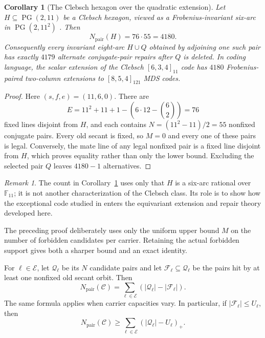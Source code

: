 \documentclass[11pt]{article}
\newtheorem{corollary}[theorem]{Corollary}
\theoremstyle{definition}
\theoremstyle{remark}
\newtheorem{remark}[theorem]{Remark}
\newcommand{\PG}{\operatorname{PG}}
\newcommand{\F}{\mathbb{F}}
\newcommand{\cC}{\mathcal{C}}
\newcommand{\cE}{\mathcal{E}}
\newcommand{\cQ}{\mathcal{Q}}
\newcommand{\cF}{\mathcal{F}}
\newcommand{\Npair}{N_{\mathrm{pair}}}
\newcommand{\pospart}[1]{\left(#1\right)_{+}}
\begin{document}
\begin{corollary}[The Clebsch hexagon over the quadratic extension]
\label{cor:clebsch-pair-extension}
Let $H\subseteq\PG(2,11)$ be a Clebsch hexagon, viewed as a
Frobenius-invariant six-arc in $\PG(2,11^2)$
\cite{RuddClebschRigidity2026}.  Then
\[
  \Npair(H)=76\cdot55=4180.
\]
Consequently every invariant eight-arc $H\cup Q$ obtained by adjoining one
such pair has exactly $4179$ alternate conjugate-pair repairs after $Q$ is
deleted.  In coding language, the scalar extension of the Clebsch
$[6,3,4]_{11}$ code has $4180$ Frobenius-paired two-column extensions to
$[8,5,4]_{121}$ MDS codes.
\end{corollary}

\begin{proof}
Here $(s,f,e)=(11,6,0)$.  There are
\[
 E=11^2+11+1-\left(6\cdot12-\binom62\right)=76
\]
fixed lines disjoint from $H$, and each contains
$N=(11^2-11)/2=55$ nonfixed conjugate pairs.  Every old secant is fixed, so
$M=0$ and every one of these pairs is legal.  Conversely, the mate line of
any legal nonfixed pair is a fixed line disjoint from $H$, which proves
equality rather than only the lower bound.  Excluding the selected pair
$Q$ leaves $4180-1$ alternatives.
\end{proof}

\begin{remark}
The count in Corollary~\ref{cor:clebsch-pair-extension} uses only that $H$
is a six-arc rational over $\F_{11}$; it is not another characterization of
the Clebsch class.  Its role is to show how the exceptional code studied in
\cite{RuddClebschRigidity2026} enters the equivariant extension and repair
theory developed here.
\end{remark}

The preceding proof deliberately uses only the uniform upper bound $M$ on
the number of forbidden candidates per carrier.  Retaining the actual
forbidden support gives both a sharper bound and an exact identity.

For $\ell\in\cE$, let $\cQ_\ell$ be its $N$ candidate pairs and let
$\cF_\ell\subseteq\cQ_\ell$ be the pairs hit by at least one nonfixed old
secant orbit.  Then
\begin{equation}\label{eq:heterogeneous}
  \Npair(\cC)=\sum_{\ell\in\cE}
  \left(|\cQ_\ell|-|\cF_\ell|\right).
\end{equation}
The same formula applies when carrier capacities vary.  In particular, if
$|\cF_\ell|\le U_\ell$, then
\[
  \Npair(\cC)\ge
  \sum_{\ell\in\cE}\pospart{|\cQ_\ell|-U_\ell}.
\]
\end{document}
